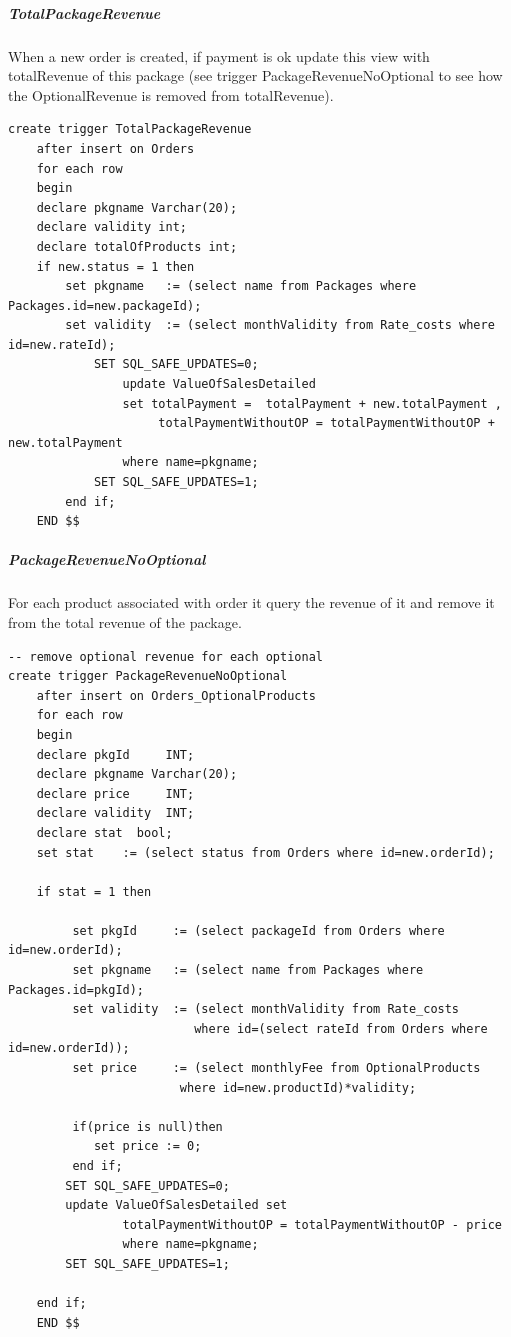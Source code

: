 \documentclass{article}
\begin{document}
\subparagraph{TotalPackageRevenue}
When a new order is created, if payment is ok update this view with totalRevenue of this package 
(see trigger PackageRevenueNoOptional to see how the OptionalRevenue is removed from totalRevenue).
\begin{lstlisting}
create trigger TotalPackageRevenue
	after insert on Orders
    for each row
    begin
    declare pkgname Varchar(20);
    declare validity int;
	declare totalOfProducts int;
    if new.status = 1 then
		set pkgname   := (select name from Packages where Packages.id=new.packageId);
		set validity  := (select monthValidity from Rate_costs where id=new.rateId);
			SET SQL_SAFE_UPDATES=0;
				update ValueOfSalesDetailed 
				set totalPayment =  totalPayment + new.totalPayment ,
                     totalPaymentWithoutOP = totalPaymentWithoutOP + new.totalPayment
				where name=pkgname;
			SET SQL_SAFE_UPDATES=1;                     
        end if;
    END $$
\end{lstlisting}

\subparagraph{PackageRevenueNoOptional}
For each product associated with order it query the revenue of it and remove it from the total revenue of the package.
\begin{lstlisting}
-- remove optional revenue for each optional
create trigger PackageRevenueNoOptional 
	after insert on Orders_OptionalProducts
    for each row
    begin
    declare pkgId     INT;
	declare pkgname Varchar(20);
	declare price     INT;
    declare validity  INT;
	declare stat  bool;
    set stat    := (select status from Orders where id=new.orderId);

    if stat = 1 then
		 
         set pkgId     := (select packageId from Orders where id=new.orderId);
		 set pkgname   := (select name from Packages where Packages.id=pkgId);
         set validity  := (select monthValidity from Rate_costs 
         				  where id=(select rateId from Orders where id=new.orderId));
		 set price     := (select monthlyFee from OptionalProducts 
		 				where id=new.productId)*validity;
         
         if(price is null)then
			set price := 0;
         end if;
        SET SQL_SAFE_UPDATES=0;    
        update ValueOfSalesDetailed set 
				totalPaymentWithoutOP = totalPaymentWithoutOP - price
				where name=pkgname;
		SET SQL_SAFE_UPDATES=1; 
        
	end if;
    END $$
\end{lstlisting}
\end{document}
